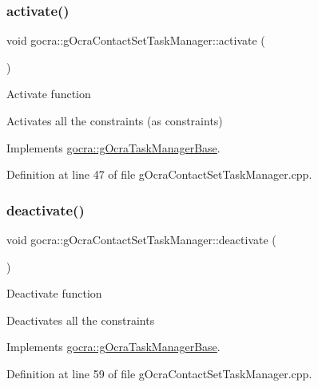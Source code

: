 \subsubsection{\texorpdfstring{activate()}{activate()}}
{\footnotesize\ttfamily void gocra\+::g\+Ocra\+Contact\+Set\+Task\+Manager\+::activate (\begin{DoxyParamCaption}{ }\end{DoxyParamCaption})\hspace{0.3cm}{\ttfamily [virtual]}}

Activate function

Activates all the constraints (as constraints) 

Implements \hyperlink{classgocra_1_1gOcraTaskManagerBase_a50cf1c408749d6e9dcfaf50bcab77dee}{gocra\+::g\+Ocra\+Task\+Manager\+Base}.



Definition at line 47 of file g\+Ocra\+Contact\+Set\+Task\+Manager.\+cpp.

\hypertarget{classgocra_1_1gOcraContactSetTaskManager_ad9f3b44b46253e5539e658cf3fd8ca37}{}\label{classgocra_1_1gOcraContactSetTaskManager_ad9f3b44b46253e5539e658cf3fd8ca37} 
\subsubsection{\texorpdfstring{deactivate()}{deactivate()}}
{\footnotesize\ttfamily void gocra\+::g\+Ocra\+Contact\+Set\+Task\+Manager\+::deactivate (\begin{DoxyParamCaption}{ }\end{DoxyParamCaption})\hspace{0.3cm}{\ttfamily [virtual]}}

Deactivate function

Deactivates all the constraints 

Implements \hyperlink{classgocra_1_1gOcraTaskManagerBase_a7cf9111e69aee47a39fe0f2976a20d6c}{gocra\+::g\+Ocra\+Task\+Manager\+Base}.



Definition at line 59 of file g\+Ocra\+Contact\+Set\+Task\+Manager.\+cpp.

\hypertarget{classgocra_1_1gOcraContactSetTaskManager_aa0136e8702029873ba4d82c0edc7c571}{}\label{classgocra_1_1gOcraContactSetTaskManager_aa0136e8702029873ba4d82c0edc7c571} 
